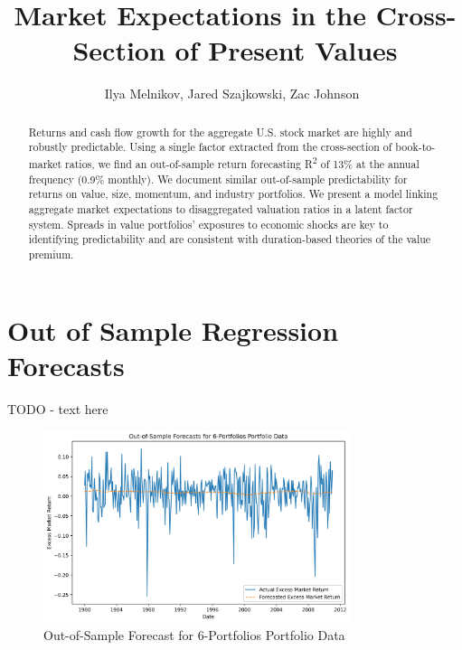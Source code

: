 \documentclass[12pt]{article}
\begin{document}
\title{
Market Expectations in the Cross-Section of Present Values
}

\author{
Ilya Melnikov, Jared Szajkowski, Zac Johnson\
}
\begin{titlepage}
\maketitle

\doublespacing
\begin{abstract}
    Returns and cash flow growth for the aggregate U.S. stock market are highly and robustly predictable. 
    Using a single factor extracted from the cross-section of book-to-market ratios, 
    we find an out-of-sample return forecasting R\textsuperscript{2} of 13\% at the annual frequency (0.9\% monthly). 
    We document similar out-of-sample predictability for returns on value, size, momentum, and industry portfolios. 
    We present a model linking aggregate market expectations to disaggregated valuation ratios in a latent factor system. 
    Spreads in value portfolios’ exposures to economic shocks are key to identifying predictability and are consistent 
    with duration-based theories of the value premium.
\end{abstract}

\end{titlepage}


\doublespacing
\section{Out of Sample Regression Forecasts}

TODO - text here

\begin{figure}[h]
    \centering
    \includegraphics[width=0.8\textwidth]{plots/Out_of_Sample_Forecasts_for_6_Portfolios_Portfolio_Data.png}
    \caption{Out-of-Sample Forecast for 6-Portfolios Portfolio Data}
    \label{fig:forecast_chart}
\end{figure}
\end{document}
